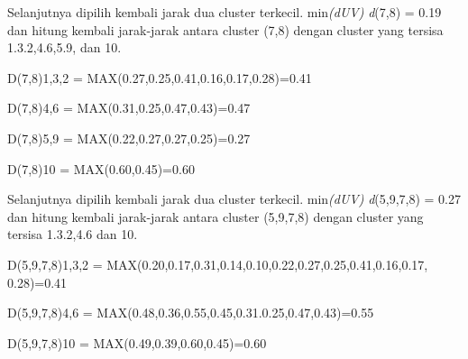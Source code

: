 \begin{enumerate}
Selanjutnya dipilih kembali jarak dua cluster terkecil. min\textit{(dUV)} \textit{d}(7,8) = 0.19 dan hitung kembali jarak-jarak antara cluster (7,8)  dengan cluster yang tersisa 1.3.2,4.6,5.9, dan 10. 

D(7,8)1,3,2 = MAX(0.27,0.25,0.41,0.16,0.17,0.28)=0.41 
 
D(7,8)4,6 = MAX(0.31,0.25,0.47,0.43)=0.47 

D(7,8)5,9 = MAX(0.22,0.27,0.27,0.25)=0.27 

D(7,8)10 = MAX(0.60,0.45)=0.60 
 
\begin{table}[htbp]
\captionsetup{singlelinecheck=off}
\caption{ Matrik Jarak, d(7,8) }
\label{tab:my-table}
\end{table}

Selanjutnya dipilih kembali jarak dua cluster terkecil. min\textit{(dUV)} \textit{d}(5,9,7,8) = 0.27 dan hitung kembali jarak-jarak antara cluster (5,9,7,8)  dengan cluster yang tersisa 1.3.2,4.6 dan 10.

D(5,9,7,8)1,3,2 = MAX(0.20,0.17,0.31,0.14,0.10,0.22,0.27,0.25,0.41,0.16,0.17,\\0.28)=0.41

D(5,9,7,8)4,6 = MAX(0.48,0.36,0.55,0.45,0.31.0.25,0.47,0.43)=0.55

D(5,9,7,8)10 = MAX(0.49,0.39,0.60,0.45)=0.60

\vspace{5cm}
\begin{table}[htbp]
\captionsetup{singlelinecheck=off}
\caption{Matrik Jarak, d(5,9,7,8)}
\label{tab:my-table}
\end{table}
\end{enumerate}

